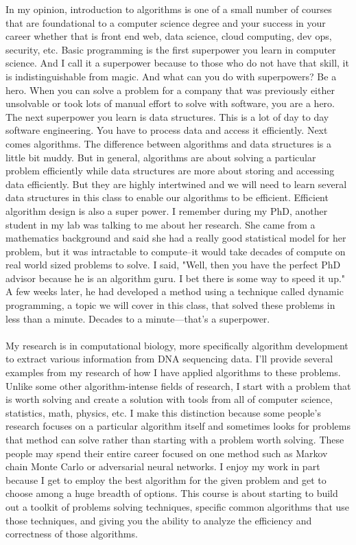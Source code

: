 \documentclass{article}\usepackage[]{graphicx}\usepackage[]{xcolor}
\begin{document}
In my opinion, introduction to algorithms is one of a small number of courses that are foundational to a computer science degree and your success in your career whether that is front end web, data science, cloud computing, dev ops, security, etc. Basic programming is the first superpower you learn in computer science. And I call it a superpower because to those who do not have that skill, it is indistinguishable from magic. And what can you do with superpowers? Be a hero. When you can solve a problem for a company that was previously either unsolvable or took lots of manual effort to solve with software, you are a hero. The next superpower you learn is data structures. This is a lot of day to day software engineering. You have to process data and access it efficiently. Next comes algorithms. The difference between algorithms and data structures is a little bit muddy. But in general, algorithms are about solving a particular problem efficiently while data structures are more about storing and accessing data efficiently. But they are highly intertwined and we will need to learn several data structures in this class to enable our algorithms to be efficient. Efficient algorithm design is also a super power. I remember during my PhD, another student in my lab was talking to me about her research. She came from a mathematics background and said she had a really good statistical model for her problem, but it was intractable to compute--it would take decades of compute on real world sized problems to solve. I said, "Well, then you have the perfect PhD advisor because he is an algorithm guru. I bet there is some way to speed it up." A few weeks later, he had developed a method using a technique called dynamic programming, a topic we will cover in this class, that solved these problems in less than a minute. Decades to a minute---that's a superpower. \\ \\

My research is in computational biology, more specifically algorithm development to extract various information from DNA sequencing data. I'll provide several examples from my research of how I have applied algorithms to these problems. Unlike some other algorithm-intense fields of research, I start with a problem that is worth solving and create a solution with tools from all of computer science, statistics, math, physics, etc. I make this distinction because some people’s research focuses on a particular algorithm itself and sometimes looks for problems that method can solve rather than starting with a problem worth solving. These people may spend their entire career focused on one method such as Markov chain Monte Carlo or adversarial neural networks. I enjoy my work in part because I get to employ the best algorithm for the given problem and get to choose among a huge breadth of options. This course is about starting to build out a toolkit of problems solving techniques, specific common algorithms that use those techniques, and giving you the ability to analyze the efficiency and correctness of those algorithms. \\ \\
\end{document}
